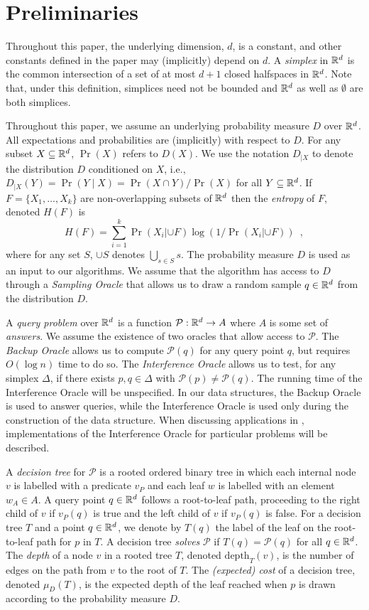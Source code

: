 \documentclass{patmorin}
\newcommand{\depth}{\mathrm{depth}}
\begin{document}
\section{Preliminaries}

Throughout this paper, the underlying dimension, $d$, is a constant, and
other constants defined in the paper may (implicitly) depend on $d$.
A \emph{simplex} in $\mathbb{R}^d$ is the common intersection of a set of at most
$d+1$ closed halfspaces in $\mathbb{R}^d$. Note that, under this definition,
simplices need not be bounded and $\mathbb{R}^d$ as well as $\emptyset$ are
both simplices.


Throughout this paper, we assume an underlying probability measure
$D$ over $\mathbb{R}^d$.  All expectations and probabilities are (implicitly)
with respect to $D$.  For any subset $X\subseteq\mathbb{R}^d$, $\Pr(X)$ refers
to $D(X)$.  We use the notation $D_{|X}$ to denote the distribution $D$
conditioned on $X$, i.e., $D_{|X}(Y)=\Pr(Y\mid X)=\Pr(X\cap Y)/\Pr(X)$
for all $Y\subseteq\mathbb{R}^d$.  If $F=\{X_1,\ldots,X_k\}$ are non-overlapping
subsets of $\mathbb{R}^d$ then the \emph{entropy} of $F$, denoted $H(F)$ is
\[
    H(F) = \sum_{i=1}^k \Pr(X_i|{\cup F})\log(1/\Pr(X_i|{\cup F})) \enspace ,
\]
where for any set $S$, $\cup S$ denotes $\bigcup_{s\in S} s$.
The probability measure $D$ is used as an input to our algorithms.
We assume that the algorithm has access to $D$ through a \emph{Sampling
Oracle} that allows us to draw a random sample $q\in\mathbb{R}^d$ from the
distribution $D$.

A \emph{query problem} over $\mathbb{R}^d$ is a function
$\mathcal{P}:\mathbb{R}^d\rightarrow A$ where $A$ is some set of \emph{answers}.
We assume the existence of two oracles that allow access to $\mathcal{P}$.
The \emph{Backup Oracle} allows us to compute $\mathcal{P}(q)$ for
any query point $q$, but requires $O(\log n)$ time to do so.  The
\emph{Interference Oracle} allows us to test, for any simplex $\Delta$,
if there exists $p,q\in\Delta$ with $\mathcal{P}(p)\neq\mathcal{P}(q)$.
The running time of the Interference Oracle will be unspecified.
In our data structures, the Backup Oracle is used to answer queries,
while the Interference Oracle is used only during the construction of the
data structure.  When discussing applications in ,
implementations of the Interference Oracle for particular problems will
be described.

A \emph{decision tree} for $\mathcal{P}$ is a rooted ordered binary
tree in which each internal node $v$ is labelled with a predicate $v_P$
and each leaf $w$ is labelled with an element $w_A\in A$.  A query point
$q\in\mathbb{R}^d$ follows a root-to-leaf path, proceeding to the right child
of $v$ if $v_P(q)$ is true and the left child of $v$ if $v_P(q)$
is false.  For a decision tree $T$ and a point $q\in\mathbb{R}^d$, we denote by
$T(q)$ the label of the leaf on the root-to-leaf path for $p$ in $T$.
A decision tree \emph{solves} $\mathcal{P}$ if $T(q)=\mathcal{P}(q)$
for all $q\in\mathbb{R}^d$. The \emph{depth} of a node $v$ in a rooted tree $T$,
denoted $\depth_T(v)$, is the number of edges on the path from $v$
to the root of $T$.  The \emph{(expected) cost} of a decision tree,
denoted $\mu_D(T)$, is the expected depth of the leaf reached when $p$
is drawn according to the probability measure $D$.
\end{document}

